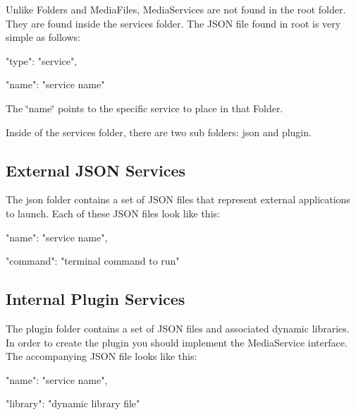 Unlike {\ttfamily Folder}s and {\ttfamily Media\-File}s, {\ttfamily Media\-Service}s are not found in the {\ttfamily root} folder. They are found inside the {\ttfamily services} folder. The J\-S\-O\-N file found in {\ttfamily root} is very simple as follows\-: \begin{DoxyVerb}{
    "type": "service",

    "name": "service name"
}
\end{DoxyVerb}


The {\ttfamily \char`\"{}name\char`\"{}} points to the specific service to place in that {\ttfamily Folder}.

Inside of the {\ttfamily services} folder, there are two sub folders\-: {\ttfamily json} and {\ttfamily plugin}.

\subsection*{External J\-S\-O\-N Services}

The {\ttfamily json} folder contains a set of J\-S\-O\-N files that represent external applications to launch. Each of these J\-S\-O\-N files look like this\-: \begin{DoxyVerb}{
    "name": "service name",

    "command": "terminal command to run"
}
\end{DoxyVerb}


\subsection*{Internal Plugin Services}

The {\ttfamily plugin} folder contains a set of J\-S\-O\-N files and associated dynamic libraries. In order to create the plugin you should implement the {\ttfamily Media\-Service} interface. The accompanying J\-S\-O\-N file looks like this\-: \begin{DoxyVerb}{
    "name": "service name",

    "library": "dynamic library file"
} \end{DoxyVerb}
 
